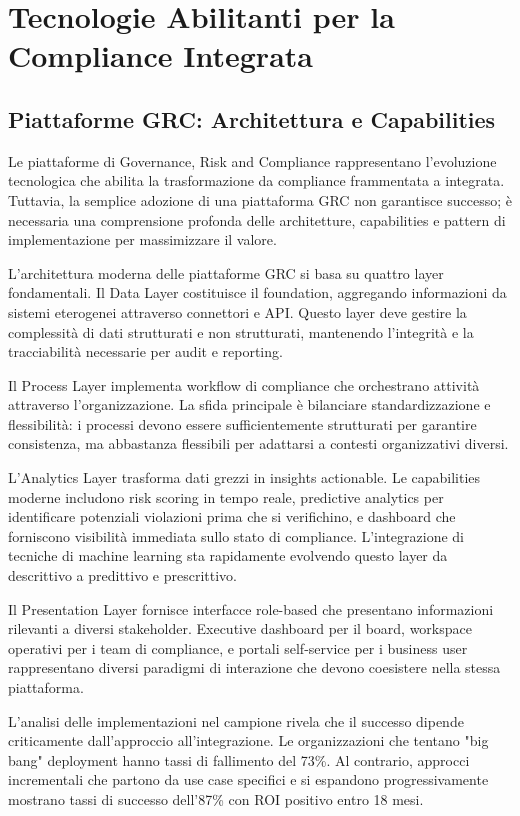 \section{Tecnologie Abilitanti per la Compliance Integrata}

\subsection{Piattaforme GRC: Architettura e Capabilities}

Le piattaforme di Governance, Risk and Compliance rappresentano l'evoluzione tecnologica che abilita la trasformazione da compliance frammentata a integrata. Tuttavia, la semplice adozione di una piattaforma GRC non garantisce successo; è necessaria una comprensione profonda delle architetture, capabilities e pattern di implementazione per massimizzare il valore.

L'architettura moderna delle piattaforme GRC si basa su quattro layer fondamentali. Il Data Layer costituisce il foundation, aggregando informazioni da sistemi eterogenei attraverso connettori e API. Questo layer deve gestire la complessità di dati strutturati e non strutturati, mantenendo l'integrità e la tracciabilità necessarie per audit e reporting.

Il Process Layer implementa workflow di compliance che orchestrano attività attraverso l'organizzazione. La sfida principale è bilanciare standardizzazione e flessibilità: i processi devono essere sufficientemente strutturati per garantire consistenza, ma abbastanza flessibili per adattarsi a contesti organizzativi diversi.

L'Analytics Layer trasforma dati grezzi in insights actionable. Le capabilities moderne includono risk scoring in tempo reale, predictive analytics per identificare potenziali violazioni prima che si verifichino, e dashboard che forniscono visibilità immediata sullo stato di compliance. L'integrazione di tecniche di machine learning sta rapidamente evolvendo questo layer da descrittivo a predittivo e prescrittivo.

Il Presentation Layer fornisce interfacce role-based che presentano informazioni rilevanti a diversi stakeholder. Executive dashboard per il board, workspace operativi per i team di compliance, e portali self-service per i business user rappresentano diversi paradigmi di interazione che devono coesistere nella stessa piattaforma.

L'analisi delle implementazioni nel campione rivela che il successo dipende criticamente dall'approccio all'integrazione. Le organizzazioni che tentano "big bang" deployment hanno tassi di fallimento del 73\%. Al contrario, approcci incrementali che partono da use case specifici e si espandono progressivamente mostrano tassi di successo dell'87\% con ROI positivo entro 18 mesi.

